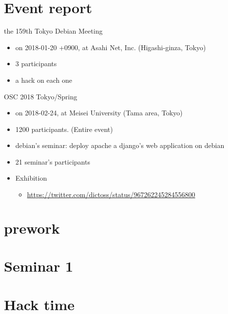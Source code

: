 \section{Event report}

\begin{frame}{the 159th Tokyo Debian Meeting}
\begin{itemize}
\item on 2018-01-20 +0900, at Asahi Net, Inc. (Higashi-ginza, Tokyo)
\item 3 participants
\item a hack on each one
\end{itemize} 
\end{frame}

\begin{frame}{OSC 2018 Tokyo/Spring}
\begin{itemize}
\item on 2018-02-24, at Meisei University (Tama area, Tokyo)
\item 1200 participants. (Entire event)
\item debian's seminar: deploy apache a django's web application on debian
\item 21 seminar's participants
\item Exhibition
\begin{itemize}
  \item \url{https://twitter.com/dictoss/status/967262245284556800}
\end{itemize} 
\end{itemize} 
\end{frame}


\section{prework}
{\footnotesize
 
}

%

\section{Seminar 1}

\section{Hack time}

